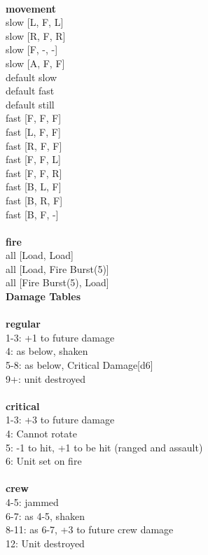 \ \\ {\bf movement } \\
slow [L, F, L] \\
slow [R, F, R] \\
slow [F, -, -] \\
slow [A, F, F] \\
default slow \\
default fast \\
default still \\
fast [F, F, F] \\
fast [L, F, F] \\
fast [R, F, F] \\
fast [F, F, L] \\
fast [F, F, R] \\
fast [B, L, F] \\
fast [B, R, F] \\
fast [B, F, -] \\
\ \\ {\bf fire } \\
all [Load, Load] \\
all [Load, Fire Burst(5)] \\
all [Fire Burst(5), Load] \\


{\bf Damage Tables} \\
\ \\ {\bf regular } \\
1-3: +1 to future damage \\
4: as below, shaken \\
5-8: as below, Critical Damage[d6] \\
9+: unit destroyed \\
\ \\ {\bf critical } \\
1-3: +3 to future damage \\
4: Cannot rotate \\
5: -1 to hit, +1 to be hit (ranged and assault) \\
6: Unit set on fire \\
\ \\ {\bf crew } \\
4-5: jammed \\
6-7: as 4-5, shaken \\
8-11: as 6-7, +3 to future crew damage \\
12: Unit destroyed \\










